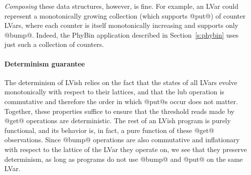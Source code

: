 {\em Composing} these data structures, however, is fine.  For example,
an LVar could represent a monotonically growing collection (which
supports @put@) of counter LVars, where each counter is itself
monotonically increasing and supports only @bump@.  Indeed, the PhyBin
application described in Section~\ref{s:phybin} uses just such a
collection of counters.

\paragraph{Determinism guarantee}

The determinism of LVish \cite{LVars-paper} relies on the fact that
the states of all LVars evolve monotonically with respect to their
lattices, and that the lub operation is commutative and therefore the
order in which @put@s occur does not matter.  Together, these
properties suffice to ensure that the threshold reads made by @get@
operations are deterministic. The rest of an LVish program is purely
functional, and its behavior is, in fact, a pure function of these
@get@ observations.  Since @bump@ operations are also commutative and
inflationary with respect to the lattice of the LVar they operate on,
we see that they preserve determinism, as long as programs do not use
@bump@ and @put@ on the same LVar.  

